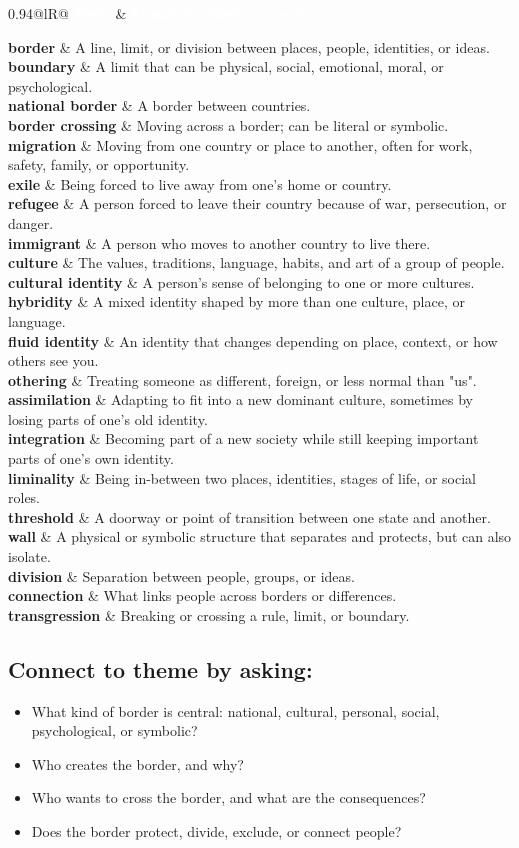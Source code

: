 \documentclass[10pt,a4paper]{article}
\makeatletter
\newcommand{\termrow}[2]{\textbf{#1} & #2 \\}
\newcommand{\termrowshaded}[2]{\rowcolor{rowgrey}\textbf{#1} & #2 \\}
\newcommand{\termtable}[1]{%
		\begin{center}
		\begin{tabularx}{0.94\textwidth}{@{}lR@{}}
		\toprule
		\rowcolor{frbgreen}\textcolor{white}{\textbf{Term}} & \textcolor{white}{\textbf{Meaning / how to use it}} \\
		\midrule
		#1
		\bottomrule
		\end{tabularx}
		\end{center}%
	}
\makeatother
\begin{document}
\termtable{
\termrow{border}{A line, limit, or division between places, people, identities, or ideas.}
\termrowshaded{boundary}{A limit that can be physical, social, emotional, moral, or psychological.}
\termrow{national border}{A border between countries.}
\termrowshaded{border crossing}{Moving across a border; can be literal or symbolic.}
\termrow{migration}{Moving from one country or place to another, often for work, safety, family, or opportunity.}
\termrowshaded{exile}{Being forced to live away from one's home or country.}
\termrow{refugee}{A person forced to leave their country because of war, persecution, or danger.}
\termrowshaded{immigrant}{A person who moves to another country to live there.}
\termrow{culture}{The values, traditions, language, habits, and art of a group of people.}
\termrowshaded{cultural identity}{A person's sense of belonging to one or more cultures.}
\termrow{hybridity}{A mixed identity shaped by more than one culture, place, or language.}
\termrowshaded{fluid identity}{An identity that changes depending on place, context, or how others see you.}
\termrow{othering}{Treating someone as different, foreign, or less normal than "us".}
\termrowshaded{assimilation}{Adapting to fit into a new dominant culture, sometimes by losing parts of one's old identity.}
\termrow{integration}{Becoming part of a new society while still keeping important parts of one's own identity.}
\termrowshaded{liminality}{Being in-between two places, identities, stages of life, or social roles.}
\termrow{threshold}{A doorway or point of transition between one state and another.}
\termrowshaded{wall}{A physical or symbolic structure that separates and protects, but can also isolate.}
\termrow{division}{Separation between people, groups, or ideas.}
\termrowshaded{connection}{What links people across borders or differences.}
\termrow{transgression}{Breaking or crossing a rule, limit, or boundary.}
}

\subsection*{Connect to theme by asking:}

\begin{itemize}
	\item What kind of border is central: national, cultural, personal, social, psychological, or symbolic?
	\item Who creates the border, and why?
	\item Who wants to cross the border, and what are the consequences?
	\item Does the border protect, divide, exclude, or connect people?
\end{itemize}
\end{document}
